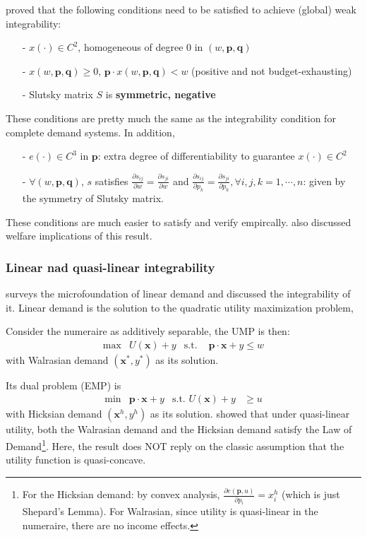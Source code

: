 \citeauthor*{lafrance1989dual} proved that the following conditions need to be satisfied to achieve (global) weak integrability:
\begin{enumerate}
    \item[-] $x(\cdot)\in C^2$, homogeneous of degree 0 in $(w,\mathbf{p},\mathbf{q})$
    \item[-] $x(w,\mathbf{p},\mathbf{q})\geq 0$, $\mathbf{p}\cdot x(w,\mathbf{p},\mathbf{q})<w$ (positive and not budget-exhausting)
    \item[-] Slutsky matrix $S$ is \textbf{symmetric, negative }
\end{enumerate} 
These conditions are pretty much the same as the integrability condition for complete demand systems. In addition,
\begin{enumerate}
    \item[-] $e(\cdot)\in C^3$ in $\mathbf{p}$: extra degree of differentiability to guarantee $x(\cdot)\in C^2$
    \item[-] $\forall (w,\mathbf{p},\mathbf{q})$, $s$ satisfies $\frac{\partial s_{ij}}{\partial w}=\frac{\partial s_{ji}}{\partial w}$ and $\frac{\partial s_{ij}}{\partial p_k}=\frac{\partial s_{ji}}{\partial p_k},\forall i,j,k=1,\cdots, n$: given by the symmetry of Slutsky matrix.
\end{enumerate}
These conditions are much easier to satisfy and verify empircally. \citeauthor*{lafrance1989dual} also discussed welfare implications of this result.

\subsubsection*{Linear nad quasi-linear integrability}

\citet*{amir2017microeconomic} surveys the microfoundation of linear demand and discussed the integrability of it. Linear demand is the solution to the quadratic utility maximization problem, 

Consider the numeraire as additively separable, the UMP is then:
\begin{align*}
    \max & U(\mathbf{x})+y & \text{s.t. }&\mathbf{p}\cdot\mathbf{x}+y\leq w
\end{align*}
with Walrasian demand $(\mathbf{x}^*,y^*)$ as its solution. 

Its dual problem (EMP) is 
\begin{align*}
    \min & \mathbf{p}\cdot\mathbf{x}+y & \text{s.t. }U(\mathbf{x})+y&\geq u
\end{align*}
with Hicksian demand $(\mathbf{x}^h,y^h)$ as its solution.
\citeauthor*{amir2017microeconomic} showed that under quasi-linear utility, both the Walrasian demand and the Hicksian demand satisfy the Law of Demand\footnote{For the Hicksian demand: by convex analysis, $\frac{\partial e(\mathbf{p},u)}{\partial p_i}=x^h_i$ (which is just Shepard's Lemma). For Walrasian, since utility is quasi-linear in the numeraire, there are no income effects.}. Here, the result does NOT reply on the classic assumption that the utility function is quasi-concave.

